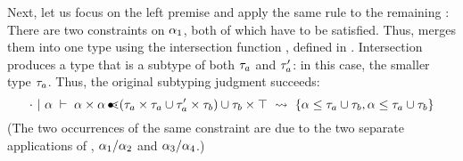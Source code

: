 Next, let us focus on the left premise and apply the same rule to
the remaining \va:\\
There are two constraints on $\alpha_1$, both of which have to be satisfied.
Thus,  merges them into one type using the intersection
function , defined in .
Intersection produces a type that is a subtype of both $\tau_a$ and $\tau'_a$:
in this case, the smaller type $\tau_a$.
Thus, the original subtyping judgment succeeds:
\[
    \cdot~\vert~\alpha\;\vdash\;\alpha \times \alpha \operatorname{\bullet\!\!\lessdot} (\tau_a \times \tau_a \cup \tau'_a \times \tau_b) \cup \tau_b \times \top\ \rightsquigarrow\  \{\alpha \leq \tau_a \cup \tau_b, \alpha \leq \tau_a \cup \tau_b\} 
\]
(The two occurrences of the same constraint are due to the two separate
applications of , $\alpha_1/\alpha_2$ and $\alpha_3/\alpha_4$.)

